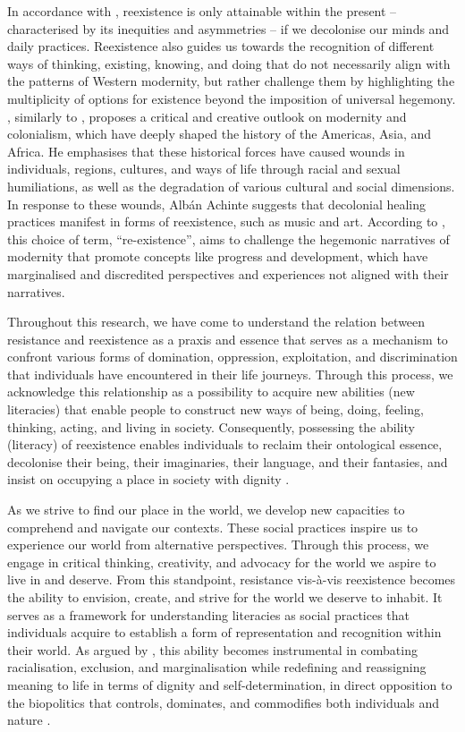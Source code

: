 \documentclass[english]{textolivre}
\begin{document}
In accordance with \textcite{alban2017}, reexistence is only attainable within the present – characterised by its inequities and asymmetries – if we decolonise our minds and daily practices. Reexistence also guides us towards the recognition of different ways of thinking, existing, knowing, and doing that do not necessarily align with the patterns of Western modernity, but rather challenge them by highlighting the multiplicity of options for existence beyond the imposition of universal hegemony. \textcite{alban2017}, similarly to \textcite{silva-souza2009letramentos,silva-souza2011letramentos}, proposes a critical and creative outlook on modernity and colonialism, which have deeply shaped the history of the Americas, Asia, and Africa. He emphasises that these historical forces have caused wounds in individuals, regions, cultures, and ways of life through racial and sexual humiliations, as well as the degradation of various cultural and social dimensions. In response to these wounds, Albán Achinte suggests that decolonial healing practices manifest in forms of reexistence, such as music and art. According to \textcite{alban2017}, this choice of term, “re-existence”, aims to challenge the hegemonic narratives of modernity that promote concepts like progress and development, which have marginalised and discredited perspectives and experiences not aligned with their narratives.

Throughout this research, we have come to understand the relation between resistance and reexistence as a praxis and essence that serves as a mechanism to confront various forms of domination, oppression, exploitation, and discrimination that individuals have encountered in their life journeys. Through this process, we acknowledge this relationship as a possibility to acquire new abilities (new literacies) that enable people to construct new ways of being, doing, feeling, thinking, acting, and living in society. Consequently, possessing the ability (literacy) of reexistence enables individuals to reclaim their ontological essence, decolonise their being, their imaginaries, their language, and their fantasies, and insist on occupying a place in society with dignity \cite{alban2017}.

As we strive to find our place in the world, we develop new capacities to comprehend and navigate our contexts. These social practices inspire us to experience our world from alternative perspectives. Through this process, we engage in critical thinking, creativity, and advocacy for the world we aspire to live in and deserve. From this standpoint, resistance vis-à-vis reexistence becomes the ability to envision, create, and strive for the world we deserve to inhabit. It serves as a framework for understanding literacies as social practices that individuals acquire to establish a form of representation and recognition within their world. As argued by \textcite{alban2017}, this ability becomes instrumental in combating racialisation, exclusion, and marginalisation while redefining and reassigning meaning to life in terms of dignity and self-determination, in direct opposition to the biopolitics that controls, dominates, and commodifies both individuals and nature \cite{alban2017}.
\end{document}
